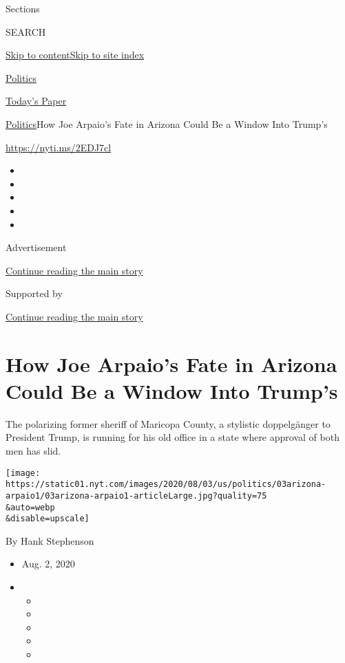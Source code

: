Sections

SEARCH

\protect\hyperlink{site-content}{Skip to
content}\protect\hyperlink{site-index}{Skip to site index}

\href{https://www.nytimes.com/section/politics}{Politics}

\href{https://myaccount.nytimes.com/auth/login?response_type=cookie\&client_id=vi}{}

\href{https://www.nytimes.com/section/todayspaper}{Today's Paper}

\href{/section/politics}{Politics}\textbar{}How Joe Arpaio's Fate in
Arizona Could Be a Window Into Trump's

\url{https://nyti.ms/2EDJ7cl}

\begin{itemize}
\item
\item
\item
\item
\item
\end{itemize}

Advertisement

\protect\hyperlink{after-top}{Continue reading the main story}

Supported by

\protect\hyperlink{after-sponsor}{Continue reading the main story}

\hypertarget{how-joe-arpaios-fate-in-arizona-could-be-a-window-into-trumps}{%
\section{How Joe Arpaio's Fate in Arizona Could Be a Window Into
Trump's}\label{how-joe-arpaios-fate-in-arizona-could-be-a-window-into-trumps}}

The polarizing former sheriff of Maricopa County, a stylistic
doppelgänger to President Trump, is running for his old office in a
state where approval of both men has slid.

\texttt{[image: https://static01.nyt.com/images/2020/08/03/us/politics/03arizona-arpaio1/03arizona-arpaio1-articleLarge.jpg?quality=75\\\&auto=webp\\\&disable=upscale]}

By Hank Stephenson

\begin{itemize}
\item
  Aug. 2, 2020
\item
  \begin{itemize}
  \item
  \item
  \item
  \item
  \item
  \end{itemize}
\end{itemize}

